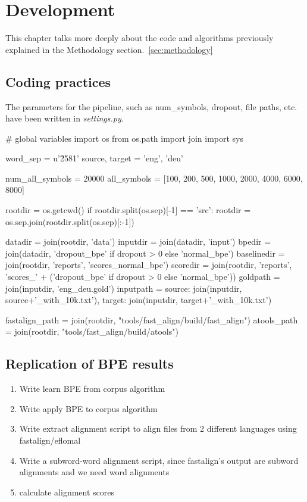 %
%

\chapter{Development}\label{sec:development}

This chapter talks more deeply about the code and algorithms previously explained in the Methodology section.~\ref{sec:methodology}

\section{Coding practices}

The parameters for the pipeline, such as num\_symbols, dropout, file paths, etc. have been written in \emph{settings.py}.

\begin{python}
# global variables
import os
from os.path import join
import sys

word_sep = u'\u2581'
source, target = 'eng', 'deu'

num_all_symbols = 20000
all_symbols = [100, 200, 500, 1000, 2000, 4000, 6000, 8000]

rootdir = os.getcwd()
if rootdir.split(os.sep)[-1] == 'src':
    rootdir = os.sep.join(rootdir.split(os.sep)[:-1])

datadir = join(rootdir, 'data')
inputdir = join(datadir, 'input')
bpedir = join(datadir, 'dropout_bpe' if dropout > 0 else 'normal_bpe')
baselinedir = join(rootdir, 'reports', 'scores_normal_bpe')
scoredir = join(rootdir, 'reports', 'scores_' + ('dropout_bpe' if dropout > 0 else 'normal_bpe'))
goldpath = join(inputdir, 'eng_deu.gold')
inputpath = {source: join(inputdir, source+'_with_10k.txt'),
            target: join(inputdir, target+'_with_10k.txt')}

fastalign_path = join(rootdir, "tools/fast_align/build/fast_align")
atools_path = join(rootdir, "tools/fast_align/build/atools")
    
\end{python}

\section{Replication of BPE results}

\begin{enumerate}
	\item Write learn BPE from corpus algorithm
	\item Write apply BPE to corpus algorithm
	\item Write extract alignment script to align files from 2 different languages using fastalign/eflomal
	\item Write a subword-word alignment script, since fastalign's output are subword alignments and we need word alignments
	\item calculate alignment scores
\end{enumerate}

